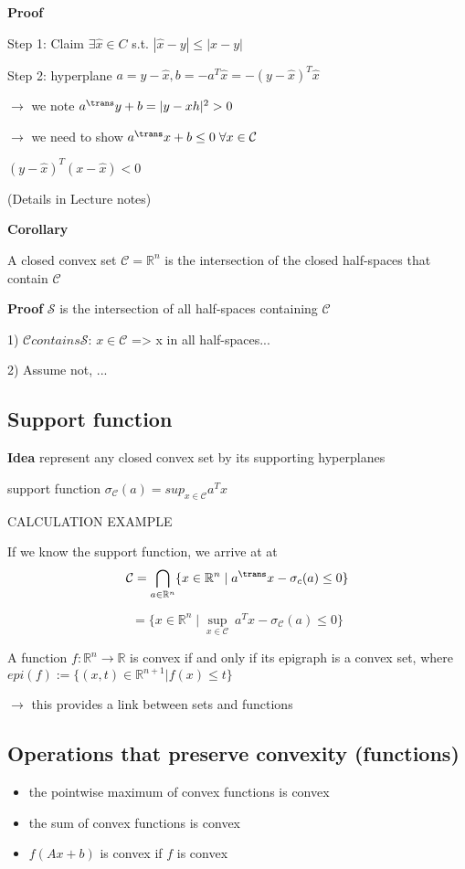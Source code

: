 \textbf{Proof}

Step 1: Claim $\exists \hat{x} \in C$ s.t. $|\hat{x}-y|\leq |x-y|$

Step 2: hyperplane $a=y-\hat{x}, b=-a^T\hat{x} = -(y-\hat{x})^T\hat{x}$

$\rightarrow$ we note $a^{\trans}y+b=|y-xh|^2>0$

$\rightarrow$ we need to show $a^{\trans}x+b\le 0 \; \forall x \in \mathcal{C}$

$(y-\hat{x})^T(x-\hat{x}) < 0$

(Details in Lecture notes)

\textbf{Corollary}

A closed convex set $\mathcal{C} = \mathbb{R}^n$
is the intersection of the closed half-spaces that contain $\mathcal{C}$

\textbf{Proof} $\mathcal{S}$ is the intersection of all half-spaces containing $\mathcal{C}$

1) $\mathcal{C} contains \mathcal{S}$: $x \in \mathcal{C}$ => x in all half-spaces...

2) Assume not, ...

\subsection{Support function}

\textbf{Idea} represent any closed convex set by its supporting hyperplanes

support function $\sigma_\mathcal{C}(a) = sup_{x\in \mathcal{C}} a^Tx$

CALCULATION EXAMPLE

If we know the support function, we arrive at at
$$  \mathcal{C} = \bigcap_{a \in \mathbb{R}^n} \{x \in \mathbb{R}^n \mid a^{\trans}x - \sigma_c(a) \leq 0\}$$

$$   = \{x \in \mathbb{R}^n \mid \underset{x \in \mathcal{C}}{\operatorname{sup}}\ a^Tx - \sigma_\mathcal{C}(a) \le 0\}$$

\begin{definition}
	A function $f : \mathbb{R}^n \rightarrow \mathbb{R}$
	is convex if and only if its epigraph is a convex set, where
	$epi(f):=\{(x,t)\in \mathbb{R}^{n+1} | f(x) \le t \}$
\end{definition}

$\rightarrow$ this provides a link between sets and functions

\subsection{Operations that preserve convexity (functions)}
\begin{itemize}
	\item the pointwise maximum of convex functions is convex
	\item the sum of convex functions is convex
	\item $f(Ax+b)$ is convex if $f$ is convex
\end{itemize}

